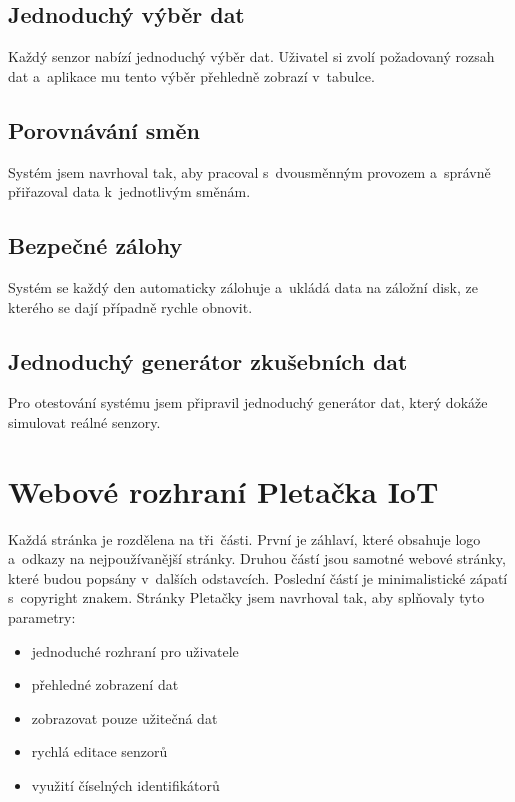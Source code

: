 \subsection{Jednoduchý výběr dat}
Každý senzor nabízí jednoduchý výběr dat.
Uživatel si zvolí požadovaný rozsah dat a~aplikace mu tento výběr přehledně zobrazí v~tabulce.


\subsection{Porovnávání směn}
Systém jsem navrhoval tak, aby pracoval s~dvousměnným provozem a~správně přiřazoval data k~jednotlivým směnám.


\subsection{Bezpečné zálohy}
Systém se každý den automaticky zálohuje a~ukládá data na záložní disk, ze kterého se dají případně rychle obnovit.


\subsection{Jednoduchý generátor zkušebních dat}
Pro otestování systému jsem připravil jednoduchý generátor dat, který dokáže simulovat reálné senzory.



\section{Webové rozhraní Pletačka IoT}
Každá stránka je rozdělena na tři~části. První je záhlaví, které obsahuje logo a~odkazy na nejpoužívanější stránky.
Druhou částí jsou samotné webové stránky, které budou popsány v~dalších odstavcích.
Poslední částí je minimalistické zápatí s~copyright znakem.\newline
Stránky Pletačky jsem navrhoval tak, aby splňovaly tyto parametry:

\begin{itemize}
    \item jednoduché rozhraní pro uživatele
    \item přehledné zobrazení dat
    \item zobrazovat pouze užitečná dat
    \item rychlá editace senzorů
    \item využití číselných identifikátorů
\end{itemize}



